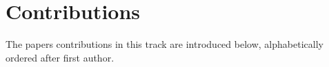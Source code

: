 

\section{Contributions}

 
The papers contributions in this track are introduced below, alphabetically ordered
after first author.
 

 















